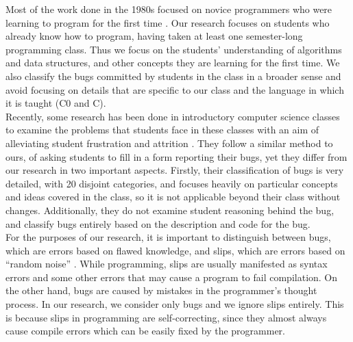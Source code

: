 \documentclass{sig-alternate}
\begin{document}
Most of the work done in the 1980s focused on novice programmers who were learning to program for the first time \cite{SpohrerSoloway86, Pea86}. Our research focuses on students who already know how to program, having taken at least one semester-long programming class. Thus we focus on the students' understanding of algorithms and data structures, and other concepts they are learning for the first time. We also classify the bugs committed by students in the class in a broader sense and avoid focusing on details that are specific to our class and the language in which it is taught (C0 and C).\\


Recently, some research has been done in introductory computer science classes to examine the problems that students face in these classes with an aim of alleviating student frustration and attrition \cite{BryceCooleyHansenHayrapetyan10}. They follow a similar method to ours, of asking students to fill in a form reporting their bugs, yet they differ from our research in two important aspects. Firstly, their classification of bugs is very detailed, with 20 disjoint categories, and focuses heavily on particular concepts and ideas covered in the class, so it is not applicable beyond their class without changes. Additionally, they do not examine student reasoning behind the bug, and classify bugs entirely based on the description and code for the bug.\\

For the purposes of our research, it is important to distinguish between bugs, which are errors based on flawed knowledge, and slips, which are errors based on ``random noise'' \cite{VanLehn90}. While programming, slips are usually manifested as syntax errors and some other errors that may cause a program to fail compilation. On the other hand, bugs are caused by mistakes in the programmer's thought process. In our research, we consider only bugs and we ignore slips entirely. This is because slips in programming are self-correcting, since they almost always cause compile errors which can be easily fixed by the programmer.\\
\end{document}

